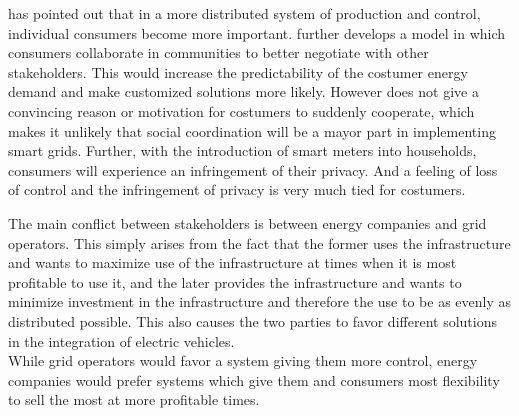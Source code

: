 \documentclass[a4paper]{article}
\begin{document}
\begin{enumerate}
 \cite{social_smart_grid} has pointed out that in a more distributed system of production and control, individual consumers 
 become more important. \cite{social_smart_grid} further develops a model in which consumers collaborate in communities 
 to better negotiate with other stakeholders. This would increase the predictability of the costumer energy demand and make 
 customized solutions more likely. However  \cite{social_smart_grid} does not give a convincing reason or motivation for costumers 
 to suddenly cooperate, which makes it unlikely that social coordination will be a mayor part in implementing smart grids. 
 Further, with the introduction of smart meters into households, consumers will experience an infringement of their privacy.
 And a feeling of loss of control and the infringement of privacy is very much tied for costumers.
 
\end{enumerate}
The main conflict between stakeholders is between energy companies and grid operators. This simply arises from the 
fact that the former uses the infrastructure and wants to maximize use of the infrastructure at times when it is 
most profitable to use it, and the later provides the infrastructure and wants to minimize investment in the infrastructure
and therefore the use to be as evenly as distributed possible. This also causes the two parties to favor 
different solutions in the integration of electric vehicles. \\
While grid operators would favor a system giving them more control, energy companies would prefer systems which give 
them and consumers most flexibility to sell the most at more profitable times. 
\end{document}

